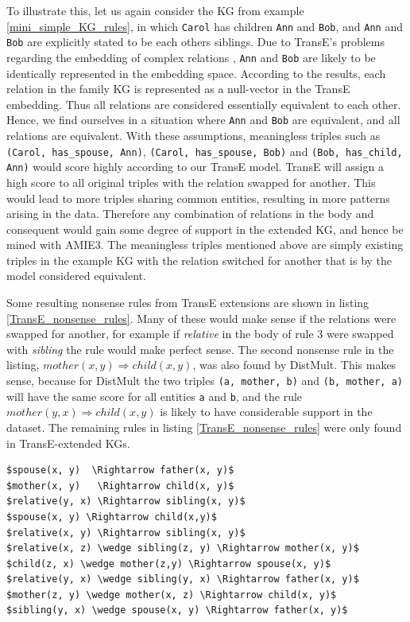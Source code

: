 To illustrate this, let us again consider the KG from example \ref{mini_simple_KG_rules}, in which \texttt{Carol} has children \texttt{Ann} and \texttt{Bob}, and \texttt{Ann} and \texttt{Bob} are explicitly stated to be each others siblings. Due to TransE's problems regarding the embedding of complex relations \cite{transH, transR}, \texttt{Ann} and \texttt{Bob} are likely to be identically represented in the embedding space. According to the results, each relation in the family KG is represented as a null-vector in the TransE embedding. Thus all relations are considered essentially equivalent to each other. Hence, we find ourselves in a situation where \texttt{Ann} and \texttt{Bob} are equivalent, and all relations are equivalent. With these assumptions, meaningless triples such as
\texttt{(Carol, has\_spouse, Ann)}, \texttt{(Carol, has\_spouse, Bob)} and \texttt{(Bob, has\_child, Ann)} would score highly according to our TransE model. TransE will assign a high score to all original triples with the relation swapped for another. This would lead to more triples sharing common entities, resulting in more patterns arising in the data. Therefore any combination of relations in the body and consequent would gain some degree of support in the extended KG, and hence be mined with AMIE3. The meaningless triples mentioned above are simply existing triples in the example KG with the relation switched for another that is by the model considered equivalent. 

Some resulting nonsense rules from TransE extensions are shown in listing \ref{TransE_nonsense_rules}. Many of these would make sense if the relations were swapped for another, for example if \textit{relative} in the body of rule 3 were swapped with \textit{sibling} the rule would make perfect sense. The second nonsense rule in the listing, $mother(x, y) \Rightarrow child(x, y)$, was also found by DistMult. This makes sense, because for DistMult the two triples \texttt{(a, mother, b)} and \texttt{(b, mother, a)} will have the same score for all entities \texttt{a} and \texttt{b}, and the rule $mother(y, x) \Rightarrow child(x, y)$ is likely to have considerable support in the dataset. The remaining rules in listing \ref{TransE_nonsense_rules} were only found in TransE-extended KGs.

\begin{lstlisting}[mathescape=true, float, caption={Selection of nonsense rules mined from KGs extended with TransE.},captionpos=b, label={TransE_nonsense_rules}]
$spouse(x, y)  \Rightarrow father(x, y)$
$mother(x, y)   \Rightarrow child(x, y)$
$relative(y, x) \Rightarrow sibling(x, y)$
$spouse(x, y) \Rightarrow child(x,y)$
$relative(x, y) \Rightarrow sibling(x, y)$
$relative(x, z) \wedge sibling(z, y) \Rightarrow mother(x, y)$
$child(z, x) \wedge mother(z,y) \Rightarrow spouse(x, y)$
$relative(y, x) \wedge sibling(y, x) \Rightarrow father(x, y)$
$mother(z, y) \wedge mother(x, z) \Rightarrow child(x, y)$
$sibling(y, x) \wedge spouse(x, y) \Rightarrow father(x, y)$
\end{lstlisting}

